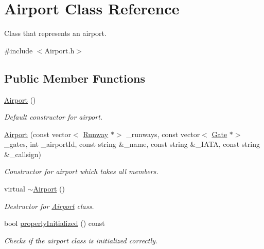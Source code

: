 \hypertarget{class_airport}{}\section{Airport Class Reference}
\label{class_airport}


Class that represents an airport.  




{\ttfamily \#include $<$Airport.\+h$>$}

\subsection*{Public Member Functions}
\begin{DoxyCompactItemize}
\item 
\mbox{\hyperlink{class_airport_a2fc0f2402c94225b9deaf76176bb887f}{Airport}} ()
\begin{DoxyCompactList}\small\item\em Default constructor for airport. \end{DoxyCompactList}\item 
\mbox{\hyperlink{class_airport_a153cf00d5a0e7a547da06e3a77da4d8a}{Airport}} (const vector$<$ \mbox{\hyperlink{class_runway}{Runway}} $\ast$$>$ \+\_\+runways, const vector$<$ \mbox{\hyperlink{class_gate}{Gate}} $\ast$$>$ \+\_\+gates, int \+\_\+airport\+Id, const string \&\+\_\+name, const string \&\+\_\+\+I\+A\+TA, const string \&\+\_\+callsign)
\begin{DoxyCompactList}\small\item\em Constructor for airport which takes all members. \end{DoxyCompactList}\item 
\mbox{\label{class_airport_a2c42073a186171586f3ac66d84af97ca}} 
virtual \mbox{\hyperlink{class_airport_a2c42073a186171586f3ac66d84af97ca}{$\sim$\+Airport}} ()
\begin{DoxyCompactList}\small\item\em Destructor for \mbox{\hyperlink{class_airport}{Airport}} class. \end{DoxyCompactList}\item 
bool \mbox{\hyperlink{class_airport_aa13e68ac58e8875837fbe888325cfff6}{properly\+Initialized}} () const
\begin{DoxyCompactList}\small\item\em Checks if the airport class is initialized correctly. \end{DoxyCompactList}\item 

\end{DoxyCompactItemize}
